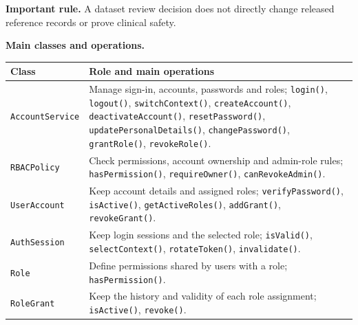 \documentclass[10pt,letterpaper]{article}
\begin{document}
\noindent\textbf{Important rule.} A dataset review decision does not directly
change released reference records or prove clinical safety.



\noindent\textbf{Main classes and operations.}\par\smallskip
\begingroup\small
\noindent\begin{tabularx}{\textwidth}{|L{0.34\textwidth}|Y|}
\hline
\textbf{Class} & \textbf{Role and main operations} \\ \hline

\texttt{AccountService} &
Manage sign-in, accounts, passwords and roles;
\texttt{login()}, \texttt{logout()}, \texttt{switchContext()},
\texttt{createAccount()}, \texttt{deactivateAccount()},
\texttt{resetPassword()}, \texttt{updatePersonalDetails()},
\texttt{changePassword()}, \texttt{grantRole()},
\texttt{revokeRole()}. \\ \hline

\texttt{RBACPolicy} &
Check permissions, account ownership and admin-role rules;
\texttt{hasPermission()}, \texttt{requireOwner()},
\texttt{canRevokeAdmin()}. \\ \hline

\texttt{UserAccount} &
Keep account details and assigned roles;
\texttt{verifyPassword()}, \texttt{isActive()},
\texttt{getActiveRoles()}, \texttt{addGrant()},
\texttt{revokeGrant()}. \\ \hline

\texttt{AuthSession} &
Keep login sessions and the selected role;
\texttt{isValid()}, \texttt{selectContext()},
\texttt{rotateToken()}, \texttt{invalidate()}. \\ \hline

\texttt{Role} &
Define permissions shared by users with a role;
\texttt{hasPermission()}. \\ \hline

\texttt{RoleGrant} &
Keep the history and validity of each role assignment;
\texttt{isActive()}, \texttt{revoke()}. \\ \hline

\end{tabularx}\par
\endgroup
\end{document}
